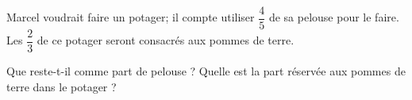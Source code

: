 %
%
    Marcel voudrait faire un potager; il compte utiliser $\dfrac{4}{5}$ de sa pelouse pour le faire. Les $\dfrac{2}{3}$ de ce potager seront
    consacrés aux pommes de terre.
    \begin{tasks}
        \task Que reste-t-il comme part de pelouse ?
        \task Quelle est la part réservée aux pommes de terre dans le potager ?
    \end{tasks}
